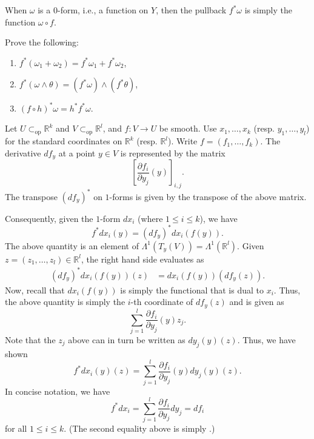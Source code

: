 \documentclass[12pt]{article}
\newcommand{\opsub}{\subset_{\operatorname{op}}}
\begin{document}
\begin{ex}
	When $\omega$ is a $0$-form, i.e., a function on $Y$, then the pullback $f^{\ast} \omega$ is simply the function $\omega \circ f$.
\end{ex}

\begin{exe}
	Prove the following:
	\begin{enumerate}
		\item $f^{\ast}(\omega_{1} + \omega_{2}) = f^{\ast}\omega_{1} + f^{\ast}\omega_{2}$,
		\item $f^{\ast}(\omega \wedge \theta) = (f^{\ast}\omega) \wedge (f^{\ast}\theta)$,
		\item $(f \circ h)^{\ast} \omega = h^{\ast} f^{\ast} \omega$.
	\end{enumerate}
\end{exe}

\begin{ex}
	Let $U \opsub \mathbb{R}^{k}$ and $V \opsub \mathbb{R}^{l}$, and $f : V \to U$ be smooth. Use $x_{1}, \ldots, x_{k}$ (resp. $y_{1}, \ldots, y_{l}$) for the standard coordinates on $\mathbb{R}^{k}$ (resp. $\mathbb{R}^{l}$). \newline
	Write $f = (f_{1}, \ldots, f_{k})$. The derivative $df_{y}$ at a point $y \in V$ is represented by the matrix
	\begin{equation*} 
		\left[\frac{\partial f_{i}}{\partial y_{j}}(y)\right]_{i, j}.
	\end{equation*}
	The transpose $(df_{y})^{\ast}$ on $1$-forms is given by the transpose of the above matrix.

	Consequently, given the $1$-form $dx_{i}$ (where $1 \le i \le k$), we have
	\begin{equation*} 
		f^{\ast} dx_{i}(y) = (df_{y})^{\ast} dx_{i}(f(y)).
	\end{equation*}
	The above quantity is an element of $\Lambda^{1}(T_{y}(V)) = \Lambda^{1}(\mathbb{R}^{l})$. Given $z = (z_{1}, \ldots, z_{l}) \in \mathbb{R}^{l}$, the right hand side evaluates as
	\begin{align*} 
		(df_{y})^{\ast} dx_{i}(f(y))(z) &= dx_{i}(f(y)) (df_{y}(z)).
	\end{align*}
	Now, recall that $dx_{i}(f(y))$ is simply the functional that is dual to $x_{i}$. Thus, the above quantity is simply the $i$-th coordinate of $df_{y}(z)$ and is given as
	\begin{equation*} 
		\sum_{j = 1}^{l} \frac{\partial f_{i}}{\partial y_{j}}(y) z_{j}.
	\end{equation*}
	Note that the $z_{j}$ above can in turn be written as $dy_{j}(y)(z)$. Thus, we have shown
	\begin{equation*} 
		f^{\ast} dx_{i}(y)(z) = \sum_{j = 1}^{l} \frac{\partial f_{i}}{\partial y_{j}}(y) dy_{j}(y)(z).
	\end{equation*}
	In concise notation, we have
	\begin{equation*} 
		f^{\ast} dx_{i} = \sum_{j = 1}^{l} \frac{\partial f_{i}}{\partial y_{j}} dy_{j} = d f_{i}
	\end{equation*}
	for all $1 \le i \le k$. (The second equality above is simply .)
\end{ex}
\end{document}
